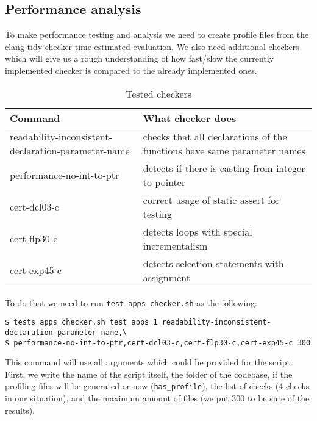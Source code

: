 \subsection{Performance analysis}

To make performance testing and analysis we need to create profile files from the clang-tidy checker time estimated evaluation. We also need additional checkers which will give us a rough understanding of how fast/slow the currently implemented checker is compared to the already implemented ones.

\begin{table}[H]
    \centering
    \begin{tabular}{|m{}|m{}|}
        \hline
        \textbf{Command} & \textbf{What checker does}  \\
        \hline
        readability-inconsistent-declaration-parameter-name & checks that all declarations of the functions have same parameter names  \\
        \hline
        performance-no-int-to-ptr & detects if there is casting from integer to pointer \\
        \hline
        cert-dcl03-c & correct usage of static assert for testing \\
        \hline
        cert-flp30-c & detects loops with special incrementalism \\
        \hline
        cert-exp45-c & detects selection statements with assignment  \\
        \hline
    \end{tabular}
    \caption{Tested checkers}
    \label{tab:test-bu-codebases}
\end{table}

To do that we need to run \lstinline{test_apps_checker.sh} as the following:

\begin{listing}[H]
\begin{verbatim}
$ tests_apps_checker.sh test_apps 1 readability-inconsistent-declaration-parameter-name,\
$ performance-no-int-to-ptr,cert-dcl03-c,cert-flp30-c,cert-exp45-c 300
\end{verbatim}
\caption{Run \lstinline{tests_apps_checker.sh} in shell}
\label{code:run-perf}
\end{listing}

This command will use all arguments which could be provided for the script. First, we write the name of the script itself, the folder of the codebase, if the profiling files will be generated or now (\lstinline{has_profile}), the list of checks (4 checks in our situation), and the maximum amount of files (we put 300 to be sure of the results).

